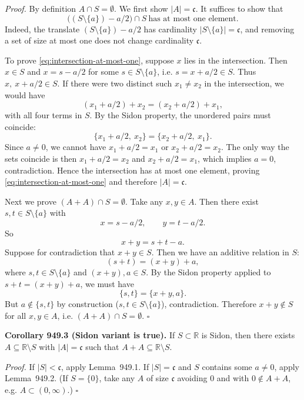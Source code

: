 \medskip
\noindent\emph{Proof.}
By definition $A\cap S=\emptyset$.
We first show $|A|=\mathfrak c$.
It suffices to show that
\begin{equation}\label{eq:intersection-at-most-one}
\bigl((S\setminus\{a\})-a/2\bigr)\cap S
\ \text{has at most one element}.
\end{equation}
Indeed, the translate $(S\setminus\{a\})-a/2$ has cardinality $|S\setminus\{a\}|=\mathfrak c$, and removing a set of size at most one does not change cardinality $\mathfrak c$.

To prove \eqref{eq:intersection-at-most-one}, suppose $x$ lies in the intersection.
Then $x\in S$ and $x=s-a/2$ for some $s\in S\setminus\{a\}$, i.e. $s=x+a/2\in S$.
Thus $x,\ x+a/2\in S$.
If there were two distinct such $x_1\ne x_2$ in the intersection, we would have
\[
(x_1+a/2)+x_2 = (x_2+a/2)+x_1,
\]
with all four terms in $S$.
By the Sidon property, the unordered pairs must coincide:
\[
\{x_1+a/2,\ x_2\}=\{x_2+a/2,\ x_1\}.
\]
Since $a\ne 0$, we cannot have $x_1+a/2=x_1$ or $x_2+a/2=x_2$.
The only way the sets coincide is then $x_1+a/2=x_2$ and $x_2+a/2=x_1$, which implies $a=0$, contradiction.
Hence the intersection has at most one element, proving \eqref{eq:intersection-at-most-one} and therefore $|A|=\mathfrak c$.

Next we prove $(A+A)\cap S=\emptyset$.
Take any $x,y\in A$.
Then there exist $s,t\in S\setminus\{a\}$ with
\[
x=s-a/2,\qquad y=t-a/2.
\]
So
\[
x+y = s+t-a.
\]
Suppose for contradiction that $x+y\in S$.
Then we have an additive relation in $S$:
\[
(s+t) = (x+y)+a,
\]
where $s,t\in S\setminus\{a\}$ and $(x+y),a\in S$.
By the Sidon property applied to $s+t=(x+y)+a$, we must have
\[
\{s,t\}=\{x+y,a\}.
\]
But $a\notin\{s,t\}$ by construction ($s,t\in S\setminus\{a\}$), contradiction.
Therefore $x+y\notin S$ for all $x,y\in A$, i.e. $(A+A)\cap S=\emptyset$.
\hfill $\square$

\medskip
\noindent\textbf{Corollary 949.3 (Sidon variant is true).}
If $S\subset\mathbb R$ is Sidon, then there exists $A\subseteq\mathbb R\setminus S$ with $|A|=\mathfrak c$ such that $A+A\subseteq\mathbb R\setminus S$.

\medskip
\noindent\emph{Proof.}
If $|S|<\mathfrak c$, apply Lemma~949.1.
If $|S|=\mathfrak c$ and $S$ contains some $a\ne0$, apply Lemma~949.2.
(If $S=\{0\}$, take any $A$ of size $\mathfrak c$ avoiding $0$ and with $0\notin A+A$, e.g. $A\subset (0,\infty)$.)
\hfill $\square$

